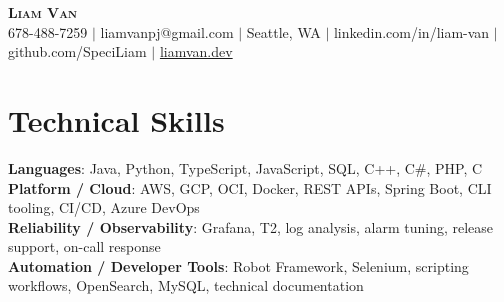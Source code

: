 \documentclass[letterpaper,11pt]{article}
\begin{document}

%
\begin{center}
    \textbf{\Huge \scshape Liam Van} \\ \vspace{1pt}
    \small 678-488-7259 $|$ \small {liamvanpj@gmail.com} $|$ Seattle, WA
 {{$|$ linkedin.com/in/liam-van} {$|$ github.com/SpeciLiam} {$|$ \href{https://liamvan.dev}{liamvan.dev}}}

\end{center}

\section{Technical Skills}
 \begin{itemize}[leftmargin=0.15in, label={}]
    \small{\item{
     \textbf{Languages}{: Java, Python, TypeScript, JavaScript, SQL, C++, C\#, PHP, C} \\
     \textbf{Platform / Cloud}{: AWS, GCP, OCI, Docker, REST APIs, Spring Boot, CLI tooling, CI/CD, Azure DevOps} \\
     \textbf{Reliability / Observability}{: Grafana, T2, log analysis, alarm tuning, release support, on-call response} \\
     \textbf{Automation / Developer Tools}{: Robot Framework, Selenium, scripting workflows, OpenSearch, MySQL, technical documentation} \\
    }}
 \end{itemize}
%

\end{document}
